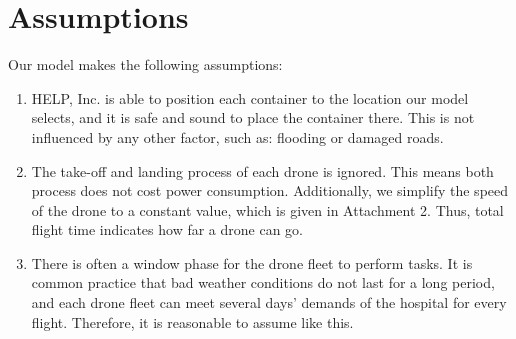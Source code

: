 \documentclass{mcmthesis}
\begin{document}
\section{Assumptions}\label{Sec:assu}
Our model makes the following assumptions:
\begin{enumerate}
	\item HELP, Inc. is able to position each container to the location our model selects, and it is safe and sound to place the container there. This is not influenced by any other factor, such as: flooding or damaged roads.
	\item The take-off and landing process of each drone is ignored. This means both process does not cost power consumption. Additionally, we simplify the speed of the drone to a constant value, which is given in Attachment 2. Thus, total flight time indicates how far a drone can go.
	\item There is often a window phase for the drone fleet to perform tasks. It is common practice that bad weather conditions do not last for a long period, and each drone fleet can meet several days' demands of the hospital for every flight. Therefore, it is reasonable to assume like this.
\end{enumerate}
\end{document}
